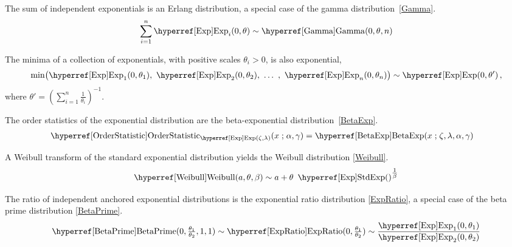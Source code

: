 The sum of independent exponentials is an Erlang distribution, a special case of the gamma distribution~\eqref{Gamma}.
\[
\sum_{i=1}^{n} \opr{Exp}_i(0,\theta) \sim \opr{Gamma}(0, \theta, n) \checked
\notag
\]


The minima of a collection of exponentials, with positive scales $\theta_i>0$, is  also exponential,
\[
\op{min}\bigl( \opr{Exp}_1(0,\theta_1),\ \opr{Exp}_2(0,\theta_2),\ \ldots\ ,\ \opr{Exp}_n(0,\theta_n) \bigr) \sim \opr{Exp}(0, \theta') \, , \checked
\notag
\]
where $\theta' = (\sum_{i=1}^{n} \tfrac{1}{\theta_i})^{-1}$. \checked


The order statistics  of the exponential distribution are the beta-exponential distribution~\eqref{BetaExp}.
\begin{align*}
\opr{OrderStatistic}&_{\opr{Exp}(\pLoc,\pScale)}  (x \given \alpha, \gamma) =  \opr{BetaExp}(x\given \pLoc, \pScale, \alpha, \gamma)  \checked
\notag
\end{align*}


A Weibull transform of the standard exponential distribution yields the Weibull distribution  \eqref{Weibull}.
\[
\opr{Weibull}(a,\theta,\beta) \sim a+ \theta\ \oprr{StdExp}{Exp}()^{\tfrac{1}{\beta}} \checked
\notag
\]


The ratio of independent anchored exponential distributions is the exponential ratio distribution \eqref{ExpRatio}, a special case of the beta prime distribution \eqref{BetaPrime}.
\label{sec:ExpRatio}
\[
\opr{BetaPrime}(0,\tfrac{\theta_1}{\theta_2} , 1,1) \sim \opr{ExpRatio}(0,\tfrac{\theta_1}{\theta_2}) \sim \frac{\opr{Exp}_1(0,\theta_1)}{\opr{Exp}_2(0,\theta_2) }
\checked
\notag
\]

